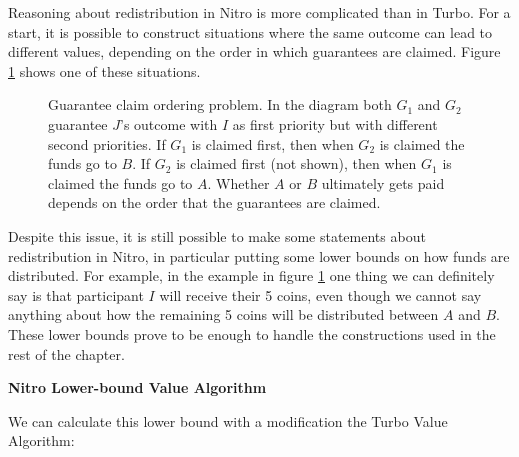 Reasoning about redistribution in Nitro is more complicated than in Turbo.
For a start, it is possible to construct situations where the same outcome can lead to different values, depending on the order in which guarantees are claimed.
Figure \ref{fig:claim-redistribution-problem} shows one of these situations.
\begin{figure}[ht]\centering
  \makebox[\textwidth][c]{}
  \caption{
    Guarantee claim ordering problem.
    In the diagram both $G_1$ and $G_2$ guarantee $J$'s outcome with $I$ as first priority but with different second priorities.
    If $G_1$ is claimed first, then when $G_2$ is claimed the funds go to $B$.
    If $G_2$ is claimed first (not shown), then when $G_1$ is claimed the funds go to $A$.
    Whether $A$ or $B$ ultimately gets paid depends on the order that the guarantees are claimed.
  }
  \label{fig:claim-redistribution-problem}
\end{figure}

Despite this issue, it is still possible to make some statements about redistribution in Nitro, in particular putting some lower bounds on how funds are distributed.
For example, in the example in figure \ref{fig:claim-redistribution-problem} one thing we can definitely say is that participant $I$ will receive their 5 coins, even though we cannot say anything about how the remaining 5 coins will be distributed between $A$ and $B$.
These lower bounds prove to be enough to handle the constructions used in the rest of the chapter.

\textbf{Nitro Lower-bound Value Algorithm}

We can calculate this lower bound with a modification the Turbo Value Algorithm:

